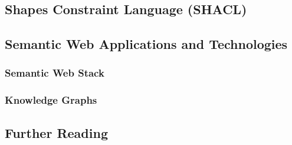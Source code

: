\subsection{Shapes Constraint Language (SHACL)}

\subsection{Semantic Web Applications and Technologies}

\subsubsection{Semantic Web Stack}

\subsubsection{Knowledge Graphs}

\subsection*{Further Reading}